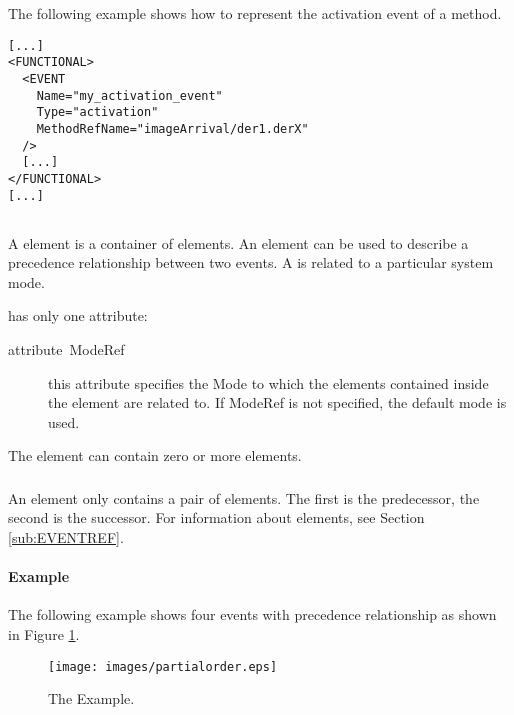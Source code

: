 The following example shows how to represent the activation event
of a method.

\begin{lstlisting}
[...]
<FUNCTIONAL>
  <EVENT 
    Name="my_activation_event"
    Type="activation"
    MethodRefName="imageArrival/der1.derX"
  /> 
  [...]
</FUNCTIONAL>
[...]
\end{lstlisting}

\subsection{}

A  element is a container of  elements.
An  element can be used to describe a precedence relationship
between two events. A  is related to a particular
system mode.

 has only one attribute:

\begin{description}
\item [{attribute~ModeRef}] this attribute specifies the Mode to which
  the  elements contained inside the 
  element are related to. If ModeRef is not specified, the default mode
  is used.
\end{description}

The  element can contain zero or more 
elements.


\subsubsection{}

An  element only contains a pair of 
elements. The first  is the predecessor, the second is
the successor. For information about  elements, see
Section \ref{sub:EVENTREF}.


\paragraph{Example}

The following  example shows four events with
precedence relationship as shown in Figure
\ref{fig:PARTIALORDER-Example}.

\begin{figure}
  \begin{center}
    \texttt{[image: images/partialorder.eps]}
  \end{center}
  \caption{The  Example.}
  \label{fig:PARTIALORDER-Example}
\end{figure}

